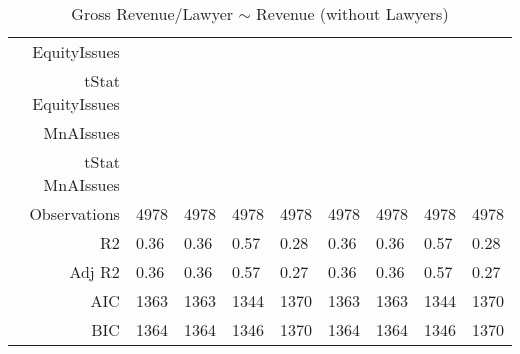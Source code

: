 \begin{table}[ht]
\begin{tabular}{rllllllll}
  EquityIssues &  &  &  &  &  &  &  &  \\ 
  tStat EquityIssues &  &  &  &  &  &  &  &  \\ 
  MnAIssues &  &  &  &  &  &  &  &  \\ 
  tStat MnAIssues &  &  &  &  &  &  &  &  \\ 
  Observations & 4978 & 4978 & 4978 & 4978 & 4978 & 4978 & 4978 & 4978 \\ 
  R2 & 0.36 & 0.36 & 0.57 & 0.28 & 0.36 & 0.36 & 0.57 & 0.28 \\ 
  Adj R2 & 0.36 & 0.36 & 0.57 & 0.27 & 0.36 & 0.36 & 0.57 & 0.27 \\ 
  AIC & 1363 & 1363 & 1344 & 1370 & 1363 & 1363 & 1344 & 1370 \\ 
  BIC & 1364 & 1364 & 1346 & 1370 & 1364 & 1364 & 1346 & 1370 \\ 
   \hline
\end{tabular}
\caption{Gross Revenue/Lawyer $\sim$ Revenue (without Lawyers)} 
\end{table}

